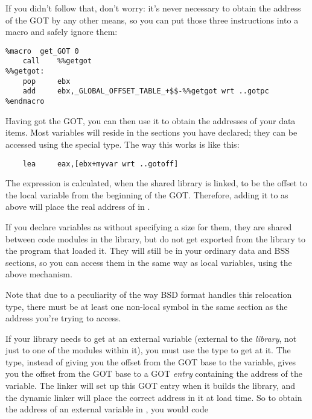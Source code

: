 If you didn't follow that, don't worry: it's never necessary to
obtain the address of the GOT by any other means, so you can put
those three instructions into a macro and safely ignore them:

\begin{lstlisting}
%macro  get_GOT 0
    call    %%getgot
%%getgot:
    pop     ebx
    add     ebx,_GLOBAL_OFFSET_TABLE_+$$-%%getgot wrt ..gotpc
%endmacro
\end{lstlisting}


Having got the GOT, you can then use it to obtain the addresses of
your data items. Most variables will reside in the sections you have
declared; they can be accessed using the 
 special  type. The
way this works is like this:

\begin{lstlisting}
    lea     eax,[ebx+myvar wrt ..gotoff]
\end{lstlisting}

The expression  is calculated, when the shared
library is linked, to be the offset to the local variable 
from the beginning of the GOT. Therefore, adding it to  as
above will place the real address of  in .

If you declare variables as  without specifying a size for
them, they are shared between code modules in the library, but do
not get exported from the library to the program that loaded it.
They will still be in your ordinary data and BSS sections, so you
can access them in the same way as local variables, using the above
 mechanism.

Note that due to a peculiarity of the way BSD  format
handles this relocation type, there must be at least one non-local
symbol in the same section as the address you're trying to access.


If your library needs to get at an external variable (external to
the \emph{library}, not just to one of the modules within it), you must
use the  type
to get at it. The  type, instead of giving you the offset from
the GOT base to the variable, gives you the offset from the GOT base to
a GOT \emph{entry} containing the address of the variable. The linker
will set up this GOT entry when it builds the library, and the
dynamic linker will place the correct address in it at load time. So
to obtain the address of an external variable  in ,
you would code

